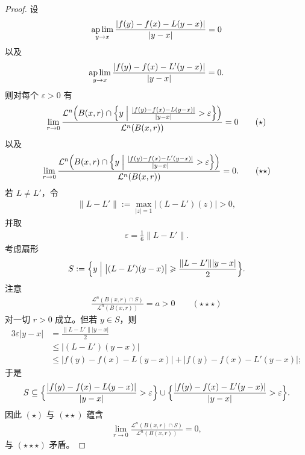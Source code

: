 \documentclass[../../main.tex]{subfiles}%
\begin{document}
\begin{proof}
设
\begin{align*}
\operatorname*{ap\,lim}_{y\to x}\frac{\lvert f(y)-f(x)-L(y-x)\rvert}{\lvert y-x\rvert}=0
\end{align*}
以及
\begin{align*}
\operatorname*{ap\,lim}_{y\to x}\frac{\lvert f(y)-f(x)-L'(y-x)\rvert}{\lvert y-x\rvert}=0.
\end{align*}
则对每个 $\varepsilon>0$ 有
\begin{align*}
\lim_{r\to0}\frac{\mathcal{L}^n\Bigl(B(x,r)\cap\Bigl\{y\Bigm|\frac{\lvert f(y)-f(x)-L(y-x)\rvert}{\lvert y-x\rvert}>\varepsilon\Bigr\}\Bigr)}{\mathcal{L}^n(B(x,r))}=0\qquad(\star)
\end{align*}
以及
\begin{align*}
\lim_{r\to0}\frac{\mathcal{L}^n\Bigl(B(x,r)\cap\Bigl\{y\Bigm|\frac{\lvert f(y)-f(x)-L'(y-x)\rvert}{\lvert y-x\rvert}>\varepsilon\Bigr\}\Bigr)}{\mathcal{L}^n(B(x,r))}=0.\qquad(\star\star)
\end{align*}
若 $L\neq L'$，令
\begin{align*}
\lVert L-L'\rVert:=\max_{\lvert z\rvert=1}\bigl\lvert(L-L')(z)\bigr\rvert>0,
\end{align*}
并取
\begin{align*}
\varepsilon=\frac{1}{6}\lVert L-L'\rVert.
\end{align*}
考虑扇形
\begin{align*}
S:=\Bigl\{y\Bigm|\bigl\lvert(L-L')(y-x)\bigr\rvert\geqslant\frac{\lVert L-L'\rVert\lvert y-x\rvert}{2}\Bigr\}.
\end{align*}
注意
\begin{align*}
\frac{\mathcal{L}^n(B(x,r)\cap S)}{\mathcal{L}^n(B(x,r))}=a>0\qquad(\star\star\star)
\end{align*}
对一切 $r>0$ 成立。但若 $y\in S$，则
\begin{align*}
3\varepsilon\lvert y-x\rvert&=\frac{\lVert L-L'\rVert\lvert y-x\rvert}{2}\\
&\leqslant\bigl\lvert(L-L')(y-x)\bigr\rvert\\
&\leqslant\lvert f(y)-f(x)-L(y-x)\rvert+\lvert f(y)-f(x)-L'(y-x)\rvert;
\end{align*}
于是
\begin{align*}
S\subseteq\Bigl\{\frac{\lvert f(y)-f(x)-L(y-x)\rvert}{\lvert y-x\rvert}>\varepsilon\Bigr\}\cup\Bigl\{\frac{\lvert f(y)-f(x)-L'(y-x)\rvert}{\lvert y-x\rvert}>\varepsilon\Bigr\}.
\end{align*}
因此 $(\star)$ 与 $(\star\star)$ 蕴含
\begin{align*}
\lim_{r\to0}\frac{\mathcal{L}^n(B(x,r)\cap S)}{\mathcal{L}^n(B(x,r))}=0,
\end{align*}
与 $(\star\star\star)$ 矛盾。


\end{proof}
\end{document}

